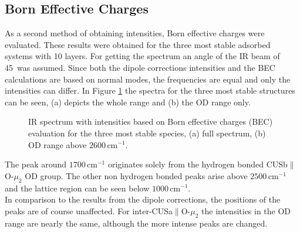 \documentclass[11pt,DIV=13,BCOR=5mm,a4paper,headinclude]{scrbook}
\begin{document}
\subsection{Born Effective Charges}\label{bec}
As a second method of obtaining intensities, Born effective charges were evaluated.
These results were obtained for the three most stable adsorbed systems with 10 layers.
For getting the spectrum an angle of the IR beam of 45\textdegree~was assumed.
Since both the dipole corrections intensities and the BEC calculations are based on normal modes, the frequencies are equal and only the intensities can differ.
In Figure \ref{abb:bec} the spectra for the three most stable structures can be seen, (a) depicts the whole range and (b) the OD range only.
\begin{figure}[!h]
    \centering
             \quad
             \caption{IR spectrum with intensities based on Born effective charges (BEC) evaluation for the three most stable species, (a) full spectrum, (b) OD range above $2600\,$cm$^{-1}$.}
            \label{abb:bec}
     \end{figure}
The peak around $1700\,$cm$^{-1}$ originates solely from the hydrogen bonded CUSb$\parallel$O-$\mu_2$ OD group.
The other non hydrogen bonded peaks arise above $2500\,$cm$^{-1}$ and the lattice region can be seen below $1000\,$cm$^{-1}$.
\\
In comparison to the results from the dipole corrections, the positions of the peaks are of course unaffected.
For inter-CUSa$\parallel$O-$\mu_2$ the intensities in the OD range are nearly the same, although the more intense peaks are changed.
\end{document}
